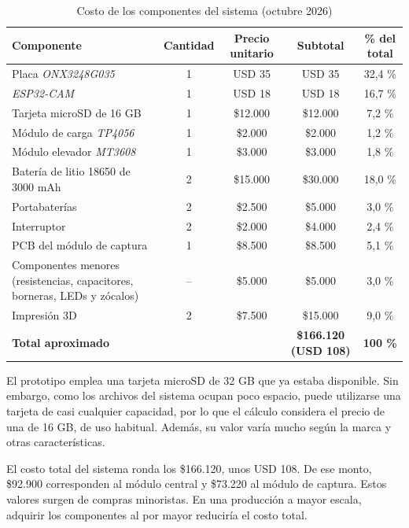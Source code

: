 \begin{table}[H]
    \centering
    \small
    \caption{Costo de los componentes del sistema (octubre 2026)}
    \label{tab:costo_total}
    \begin{tabular}{|>{\raggedright\arraybackslash}p{4.4cm}|c|c|c|c|}
        \hline
        \textbf{Componente} & \textbf{Cantidad} & \textbf{Precio unitario} & \textbf{Subtotal} & \textbf{\% del total} \\
        \hline
        Placa \emph{ONX3248G035} & 1 & USD 35 & USD 35 & 32,4 \% \\
        \hline
        \emph{ESP32-CAM} & 1 & USD 18 & USD 18 & 16,7 \% \\
        \hline
        Tarjeta microSD de 16 GB & 1 & \$12.000 & \$12.000 & 7,2 \% \\
        \hline
        Módulo de carga \emph{TP4056} & 1 & \$2.000 & \$2.000 & 1,2 \% \\
        \hline
        Módulo elevador \emph{MT3608} & 1 & \$3.000 & \$3.000 & 1,8 \% \\
        \hline
        Batería de litio 18650 de 3000 mAh & 2 & \$15.000 & \$30.000 & 18,0 \% \\
        \hline
        Portabaterías & 2 & \$2.500 & \$5.000 & 3,0 \% \\
        \hline
        Interruptor & 2 & \$2.000 & \$4.000 & 2,4 \% \\
        \hline
        PCB del módulo de captura & 1 & \$8.500 & \$8.500 & 5,1 \% \\
        \hline
        Componentes menores (resistencias, capacitores, borneras, LEDs y zócalos) & -- & \$5.000 & \$5.000 & 3,0 \% \\
        \hline
        Impresión 3D & 2 & \$7.500 & \$15.000 & 9,0 \% \\
        \hline
        \textbf{Total aproximado} & & & \textbf{\$166.120 (USD 108)} & \textbf{100 \%} \\
        \hline
    \end{tabular}
\end{table}

El prototipo emplea una tarjeta microSD de 32 GB que ya estaba disponible. Sin embargo, como los archivos del sistema ocupan poco espacio, puede utilizarse una tarjeta de casi cualquier capacidad, por lo que el cálculo considera el precio de una de 16 GB, de uso habitual. Además, su valor varía mucho según la marca y otras características.

El costo total del sistema ronda los \$166.120, unos USD 108. De ese monto, \$92.900 corresponden al módulo central y \$73.220 al módulo de captura. Estos valores surgen de compras minoristas. En una producción a mayor escala, adquirir los componentes al por mayor reduciría el costo total.

